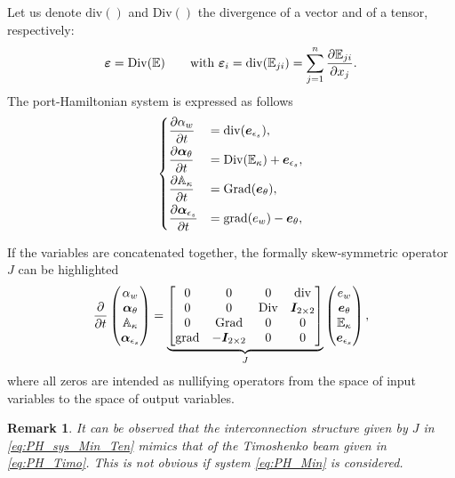 \documentclass[preprint,12pt]{elsarticle}
\newtheorem{remark}{Remark}
\begin{document}
Let us denote $\mathrm{div}()$ and $\mathrm{Div}()$ the divergence of a vector and of a tensor, respectively:
\begin{equation*}
    \bm{\varepsilon} = \mathrm{Div}(\mathbb{E})  \qquad \text{with } \bm{\varepsilon}_i = \mathrm{div}(\mathbb{E}_{ji}) = \sum_{j = 1}^n \diffp{\mathbb{E}_{ji}}{x_j}.
\end{equation*}
The port-Hamiltonian system is expressed as follows 
\begin{equation}
\begin{cases}
\displaystyle\diffp{\alpha_w}{t} &= \mathrm{div}(\bm{e}_{\epsilon_s}), \vspace{1mm} \\
\displaystyle\diffp{\bm\alpha_\theta}{t} &= \mathrm{Div}( \mathbb{E}_{\kappa}) + \bm{e}_{\epsilon_s}, \vspace{1mm} \\
\displaystyle\diffp{\mathbb{A}_\kappa}{t} &= \mathrm{Grad}(\bm{e}_{\theta}), \vspace{1mm} \\
\displaystyle\diffp{ \bm\alpha_{\epsilon_s} }{t} &= \mathrm{grad}(e_w) - \bm{e}_{\theta},
\end{cases}
\end{equation}

If the variables are concatenated together, the formally skew-symmetric operator $J$ can be highlighted 
\begin{equation}
\label{eq:PH_sys_Min_Ten}
\diffp{}{t}
\begin{pmatrix}
\alpha_w \\
\bm\alpha_\theta \\
\mathbb{A}_\kappa \\
\bm\alpha_{\epsilon_s} \\
\end{pmatrix} = 
\underbrace{\begin{bmatrix}
	0  & 0  & 0  & \mathrm{div} \\
	0 & 0 &  \mathrm{Div} & \bm{I}_{2 \times 2}\\
	0  & \mathrm{Grad}  & 0  & 0\\
	\mathrm{grad} & -\bm{I}_{2 \times 2} &  0 & 0  \\
	\end{bmatrix}}_{J}
\begin{pmatrix}
e_w \\
\bm{e}_{\theta} \\
\mathbb{E}_{\kappa} \\
\bm{e}_{\epsilon_s} \\
\end{pmatrix},
\end{equation}
where all zeros are intended as nullifying operators from the space of input variables to the space of output variables.
\begin{remark}
It can be observed that the interconnection structure given by $J$ in \eqref{eq:PH_sys_Min_Ten} mimics that of the Timoshenko beam given in \eqref{eq:PH_Timo}. This is not obvious if system \eqref{eq:PH_Min} is considered.
\end{remark}
\end{document}
